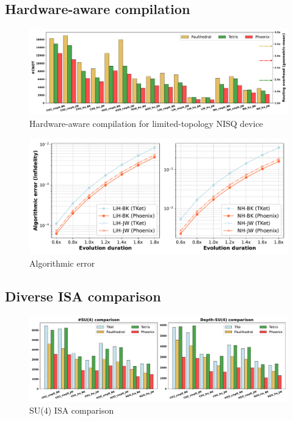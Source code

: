\documentclass[conference]{IEEEtran}
\begin{document}
\subsection{Hardware-aware compilation}


\begin{figure}[tbp]
    \centering
    \includegraphics[width=\columnwidth]{figures/num_2q_gates_manhattan.pdf}
    \caption{Hardware-aware compilation for limited-topology NISQ device}
    \label{fig:manhattan}
\end{figure}


\begin{figure}[tbp]
    \centering
    \includegraphics[width=\columnwidth]{figures/algo_err.pdf}
    \caption{Algorithmic error}
    \label{fig:algo-err}
\end{figure}




\subsection{Diverse ISA comparison}


\begin{figure}[tbp]
    \centering
    \includegraphics[width=\columnwidth]{figures/su4_comparison.pdf}
    \caption{SU(4) ISA comparison}
    \label{fig:su4-isa}
\end{figure}
\end{document}
